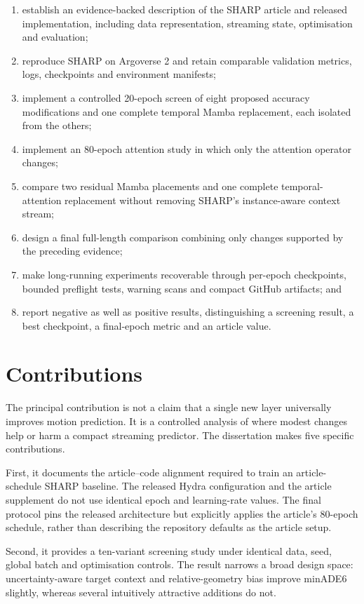 \begin{enumerate}
    \item establish an evidence-backed description of the SHARP article and released implementation, including data representation, streaming state, optimisation and evaluation;
    \item reproduce SHARP on Argoverse 2 and retain comparable validation metrics, logs, checkpoints and environment manifests;
    \item implement a controlled 20-epoch screen of eight proposed accuracy modifications and one complete temporal Mamba replacement, each isolated from the others;
    \item implement an 80-epoch attention study in which only the attention operator changes;
    \item compare two residual Mamba placements and one complete temporal-attention replacement without removing SHARP's instance-aware context stream;
    \item design a final full-length comparison combining only changes supported by the preceding evidence;
    \item make long-running experiments recoverable through per-epoch checkpoints, bounded preflight tests, warning scans and compact GitHub artifacts; and
    \item report negative as well as positive results, distinguishing a screening result, a best checkpoint, a final-epoch metric and an article value.
\end{enumerate}

\section{Contributions}

The principal contribution is not a claim that a single new layer universally improves motion prediction. It is a controlled analysis of where modest changes help or harm a compact streaming predictor. The dissertation makes five specific contributions.

First, it documents the article--code alignment required to train an article-schedule SHARP baseline. The released Hydra configuration and the article supplement do not use identical epoch and learning-rate values. The final protocol pins the released architecture but explicitly applies the article's 80-epoch schedule, rather than describing the repository defaults as the article setup.

Second, it provides a ten-variant screening study under identical data, seed, global batch and optimisation controls. The result narrows a broad design space: uncertainty-aware target context and relative-geometry bias improve minADE6 slightly, whereas several intuitively attractive additions do not.


